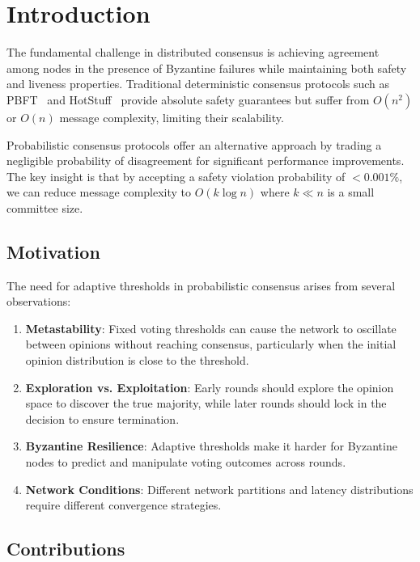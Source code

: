 \section{Introduction}


The fundamental challenge in distributed consensus is achieving agreement among nodes in the presence of Byzantine failures while maintaining both safety and liveness properties. Traditional deterministic consensus protocols such as PBFT~\cite{castro1999practical} and HotStuff~\cite{yin2019hotstuff} provide absolute safety guarantees but suffer from $O(n^2)$ or $O(n)$ message complexity, limiting their scalability.

Probabilistic consensus protocols offer an alternative approach by trading a negligible probability of disagreement for significant performance improvements. The key insight is that by accepting a safety violation probability of $< 0.001\%$, we can reduce message complexity to $O(k \log n)$ where $k \ll n$ is a small committee size.

\subsection{Motivation}

The need for adaptive thresholds in probabilistic consensus arises from several observations:

\begin{enumerate}
\item \textbf{Metastability}: Fixed voting thresholds can cause the network to oscillate between opinions without reaching consensus, particularly when the initial opinion distribution is close to the threshold.

\item \textbf{Exploration vs. Exploitation}: Early rounds should explore the opinion space to discover the true majority, while later rounds should lock in the decision to ensure termination.

\item \textbf{Byzantine Resilience}: Adaptive thresholds make it harder for Byzantine nodes to predict and manipulate voting outcomes across rounds.

\item \textbf{Network Conditions}: Different network partitions and latency distributions require different convergence strategies.
\end{enumerate}

\subsection{Contributions}

